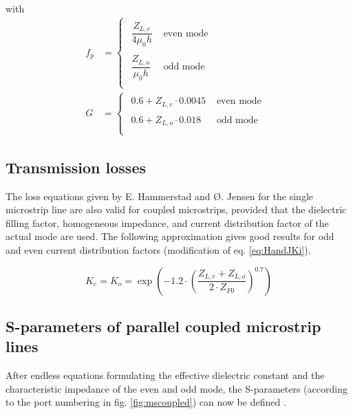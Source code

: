 with
\begin{align}
f_{p} &=
\begin{cases}
\begin{array}{ll}
\dfrac{Z_{L,e}}{4\mu_{0} h} & \textrm{ even mode }\\&\\
\dfrac{Z_{L,o}}{\mu_{0} h}  & \textrm{ odd mode }\\
\end{array}
\end{cases}\\
G &=
\begin{cases}
\begin{array}{ll}
0.6 + Z_{L,e}\cdot 0.0045 & \textrm{ even mode }\\&\\
0.6 + Z_{L,o}\cdot 0.018 & \textrm{ odd mode }\\
\end{array}
\end{cases}
\end{align}

\subsection{Transmission losses}

The loss equations given by E. Hammerstad and {\O}. Jensen
\cite{Hammerstad} for the single microstrip line are also valid for
coupled microstrips, provided that the dielectric filling factor,
homogeneous impedance, and current distribution factor of the actual
mode are used.  The following approximation gives good results for odd
and even current distribution factors (modification of
eq. \eqref{eq:HandJKi}).

\begin{equation}
K_e = K_o = \exp{\left(-1.2\cdot\left(\dfrac{Z_{L,e} + Z_{L,o}}{2\cdot Z_{F0}}\right)^{0.7}\right)}
\end{equation}

\subsection{S-parameters of parallel coupled microstrip lines}

After endless equations formulating the effective dielectric constant
and the characte\-ris\-tic impe\-dance of the even and odd mode, the
S-parameters (according to the port numbering in
fig. \ref{fig:mscoupled}) can now be defined \cite{Edwards}.

